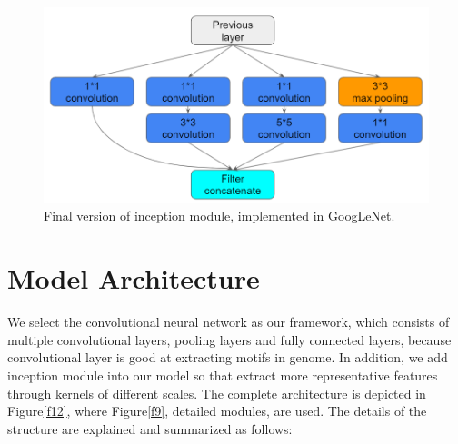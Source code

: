 \begin{figure}[H]
    \centering
    \includegraphics[width=0.8\columnwidth]{body/figure/figure8.png}
    \captionsetup{labelfont=bf}
    \renewcommand{\baselinestretch}{1.0}
    \caption[Final version of inception module]{Final version of inception module, implemented in GoogLeNet.}
    \label{f8}
\end{figure}

\section{Model Architecture} \label{method}
We select the convolutional neural network as our framework, which consists of multiple convolutional layers, pooling layers and fully connected layers, because convolutional layer is good at extracting motifs in genome. In addition, we add inception module into our model so that extract more representative features through kernels of different scales. The complete architecture is depicted in Figure\ref{f12}, where Figure\ref{f9}, detailed modules, are used. The details of the structure are explained and summarized as follows:

